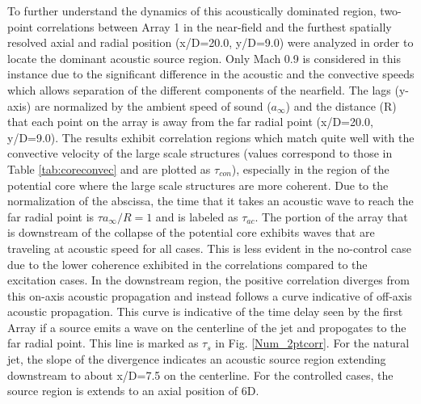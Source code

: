 \documentclass[english]{aiaa-tc}
\begin{document}
To further understand the dynamics of this acoustically dominated region, two-point correlations between Array 1 in the near-field and the furthest spatially resolved axial and radial position (x/D=20.0, y/D=9.0) were analyzed in order to locate the dominant acoustic source region. Only Mach 0.9 is considered in this instance due to the significant difference in the acoustic and the convective speeds which allows separation of the different components of the nearfield.
The lags (y-axis) are normalized by the ambient speed of sound ($a_{\infty}$) and the distance (R) that each point on the array is away from the far radial point (x/D=20.0, y/D=9.0). 
The results exhibit correlation regions which match quite well with the convective velocity of the large scale structures (values correspond to those in Table \ref{tab:coreconvec} and are plotted as $\tau_{con}$), especially in the region of the potential core where the large scale structures are more coherent. 
Due to the normalization of the abscissa, the time that it takes an acoustic wave to reach the far radial point is $\tau a_{\infty}/R=1$ and is labeled as $\tau_{ac}$. The portion of the array that is downstream of the collapse of the potential core exhibits waves that are traveling at acoustic speed for all cases. This is less evident in the no-control case due to the lower coherence exhibited in the correlations compared to the excitation cases. 
In the downstream region, the positive correlation diverges from this on-axis acoustic propagation and instead follows a curve indicative of off-axis acoustic propagation. This curve is indicative of the time delay seen by the first Array if a source emits a wave on the centerline of the jet and propogates to the far radial point. This line is marked as $\tau_{s}$ in Fig. \ref{Num_2ptcorr}.  
For the natural jet, the slope of the divergence indicates an acoustic source region extending downstream to about x/D=7.5 on the centerline. For the controlled cases, the source region is extends to an axial position of 6D. 
\end{document}

